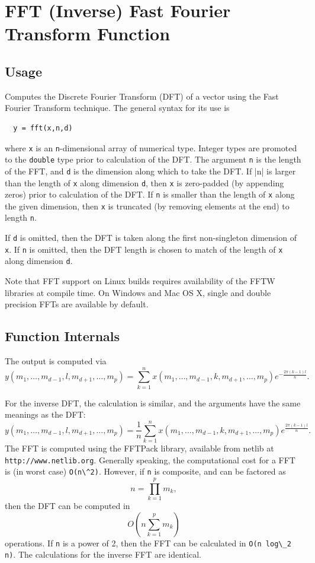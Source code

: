 \section{FFT (Inverse) Fast Fourier Transform Function}

\subsection{Usage}

Computes the Discrete Fourier Transform (DFT) of a vector using the
Fast Fourier Transform technique.  The general syntax for its use is
\begin{verbatim}
  y = fft(x,n,d)
\end{verbatim}
where \verb|x| is an \verb|n|-dimensional array of numerical type.
Integer types are promoted to the \verb|double| type prior to 
calculation of the DFT. The argument \verb|n| is the length of the
FFT, and \verb|d| is the dimension along which to take the DFT.  If
|n| is larger than the length of \verb|x| along dimension \verb|d|,
then \verb|x| is zero-padded (by appending zeros) prior to calculation
of the DFT.  If \verb|n| is smaller than the length of \verb|x|  along
the given dimension, then \verb|x| is truncated (by removing elements
at the end) to length \verb|n|.  

If \verb|d| is omitted, then the DFT is taken along the first 
non-singleton dimension of \verb|x|.  If \verb|n| is omitted, then
the DFT length is chosen to match of the length of \verb|x| along
dimension \verb|d|.  

Note that FFT support on Linux builds requires availability
of the FFTW libraries at compile time.  On Windows and Mac OS
X, single and double precision FFTs are available by default.
\subsection{Function Internals}

The output is computed via
\[
y(m_1,\ldots,m_{d-1},l,m_{d+1},\ldots,m_{p}) = 
\sum_{k=1}^{n} x(m_1,\ldots,m_{d-1},k,m_{d+1},\ldots,m_{p})
e^{-\frac{2\pi(k-1)l}{n}}.
\]

For the inverse DFT, the calculation is similar, and the arguments
have the same meanings as the DFT:
\[
y(m_1,\ldots,m_{d-1},l,m_{d+1},\ldots,m_{p}) = 
\frac{1}{n} \sum_{k=1}^{n} x(m_1,\ldots,m_{d-1},k,m_{d+1},\ldots,m_{p})
e^{\frac{2\pi(k-1)l}{n}}.
\]
The FFT is computed using the FFTPack library, available from 
netlib at \verb|http://www.netlib.org|.  Generally speaking, the 
computational cost for a FFT is (in worst case) \verb|O(n\^2)|.
However, if \verb|n| is composite, and can be factored as
\[
n = \prod_{k=1}^{p} m_k,
\]
then the DFT can be computed in 
\[
O(n \sum_{k=1}^{p} m_k)
\]
operations.  If \verb|n| is a power of 2, then the FFT can be
calculated in \verb|O(n log\_2 n)|.  The calculations for the
inverse FFT are identical.
